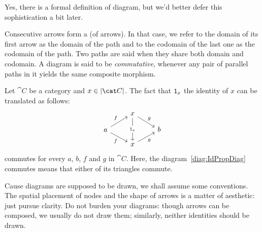 Yes, there is a formal definition of diagram, but we'd better defer this sophistication a bit later.

Consecutive arrows form a  (of arrows). In that case, we refer to the domain of its first arrow as the domain of the path and to the codomain of the last one as the codomain of the path. Two paths are said  when they share both domain and codomain. A diagram is said to be {\em commutative}, whenever any pair of parallel paths in it yields the same composite morphism.

\begin{example}
Let \(\cat C\) be a category and \(x \in \obj{\cat C}\). The fact that \(\mathtt 1_x\) the identity of \(x\) can be translated as follows:
\begin{equation}\begin{tikzcd}[row sep=small]
 & x \ar["{\id_x}" description, dd] \ar["g", dr] & \\
a \ar["f", ur] \ar["f", dr, swap] & &  b \\
  & x \ar["g", ur, swap] &
\end{tikzcd}\label{diag:IdPropDiag}\end{equation}
commutes for every \(a\), \(b\), \(f\) and \(g\) in \(\cat C\). Here, the diagram~\eqref{diag:IdPropDiag} commutes means that either of its triangles commute.
\end{example}

\begin{example}
\end{example}

Cause diagrams are supposed to be drawn, we shall assume some conventions. The spatial placement of nodes and the shape of arrows is a matter of aesthetic: just pursue clarity. Do not burden your diagrams: though arrows can be composed, we usually do not draw them; similarly, neither identities should be drawn.

